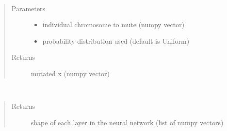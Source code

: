 \documentclass[letterpaper,10pt,english]{sphinxmanual}
\begin{document}
\begin{fulllineitems}

\begin{fulllineitems}
\label{\detokenize{index:genetic_optimizer.GeneticOptimizer.mutate}}~\begin{quote}\begin{description}
\item[{Parameters}] \leavevmode\begin{itemize}
\item {} 
 \textendash{} individual chromosome to mute (numpy vector)

\item {} 
 \textendash{} probability distribution used (default is Uniform)

\end{itemize}

\item[{Returns}] \leavevmode
mutated x (numpy vector)

\end{description}\end{quote}

\end{fulllineitems}


\begin{fulllineitems}
\label{\detokenize{index:genetic_optimizer.GeneticOptimizer.original_weights_shape}}~\begin{quote}\begin{description}
\item[{Returns}] \leavevmode
shape of each layer in the neural network (list of numpy vectors)

\end{description}\end{quote}

\end{fulllineitems}


\end{fulllineitems}
\end{document}
